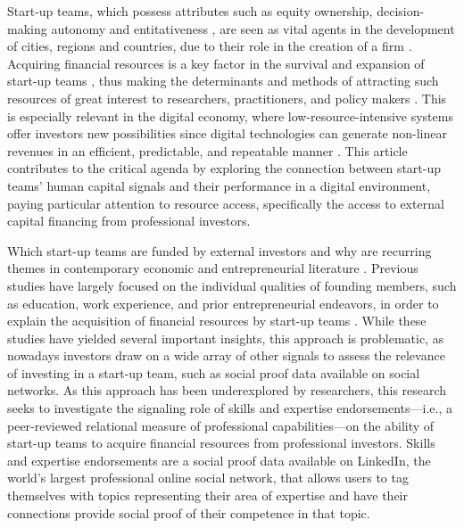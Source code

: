 \documentclass[12pt]{article}
\begin{document}
Start-up teams, which possess attributes such as equity ownership, decision-making autonomy and entitativeness \citep{knight2020start}, are seen as vital agents in the development of cities, regions and countries, due to their role in the creation of a firm \citep{audretsch2001linking, autio2016entrepreneurship}. Acquiring financial resources is a key factor in the survival and expansion of start-up teams \citep{rosenbusch2013does}, thus making the determinants and methods of attracting such resources of great interest to researchers, practitioners, and policy makers \citep{EUcommission2015digital}. This is especially relevant in the digital economy, where low-resource-intensive systems offer investors new possibilities since digital technologies can generate non-linear revenues in an efficient, predictable, and repeatable manner \citep{nambisan2017digital, sahut2021age}. This article contributes to the critical agenda by exploring the connection between start-up teams' human capital signals and their performance in a digital environment, paying particular attention to resource access, specifically the access to external capital financing from professional investors.

Which start-up teams are funded by external investors and why are recurring themes in contemporary economic and entrepreneurial literature \citep{baum2004picking, beckman2007early, bernstein2017attracting, franke2006you, franke2008venture, plummer2016better, kaplan2009should, shane2002network}. Previous studies have largely focused on the individual qualities of founding members, such as education, work experience, and prior entrepreneurial endeavors, in order to explain the acquisition of financial resources by start-up teams \citep{shane2002network, hsu2007experienced}. While these studies have yielded several important insights, this approach is problematic, as nowadays investors draw on a wide array of other signals to assess the relevance of investing in a start-up team, such as social proof data available on social networks. As this approach has been underexplored by researchers, this research seeks to investigate the signaling role of skills and expertise endorsements—i.e., a peer-reviewed relational measure of professional capabilities—on the ability of start-up teams to acquire financial resources from professional investors. Skills and expertise endorsements are a social proof data available on LinkedIn, the world's largest professional online social network, that allows users to tag themselves with topics representing their area of expertise and have their connections provide social proof of their competence in that topic.
\end{document}

